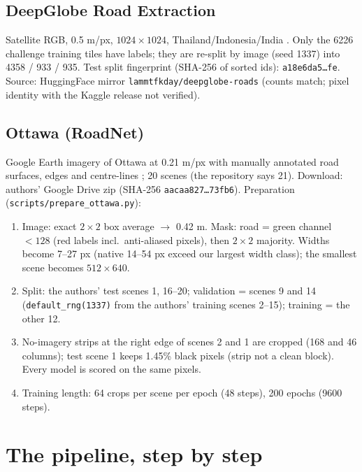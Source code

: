 \documentclass[11pt]{article}
\begin{document}
\subsection{DeepGlobe Road Extraction}
Satellite RGB, 0.5 m/px, $1024\times1024$, Thailand/Indonesia/India \cite{demir2018}. Only the 6226
challenge training tiles have labels; they are re-split by image (seed 1337) into 4358 / 933 / 935.
Test split fingerprint (SHA-256 of sorted ids): \texttt{a18e6da5\ldots fe}. Source: HuggingFace mirror
\texttt{lammtfkday/deepglobe-roads} (counts match; pixel identity with the Kaggle release not verified).

\subsection{Ottawa (RoadNet)}
Google Earth imagery of Ottawa at 0.21 m/px with manually annotated road surfaces, edges and
centre-lines \cite{liu2019roadnet}; 20 scenes (the repository says 21). Download: authors' Google Drive
zip (SHA-256 \texttt{aacaa827\ldots 73fb6}). Preparation (\texttt{scripts/prepare\_ottawa.py}):
\begin{enumerate}
  \item Image: exact $2\times2$ box average $\to$ 0.42 m. Mask: road = green channel $<128$ (red
        labels incl.\ anti-aliased pixels), then $2\times2$ majority. Widths become 7--27 px (native
        14--54 px exceed our largest width class); the smallest scene becomes $512\times640$.
  \item Split: the authors' test scenes 1, 16--20; validation = scenes 9 and 14
        (\texttt{default\_rng(1337)} from the authors' training scenes 2--15); training = the other 12.
  \item No-imagery strips at the right edge of scenes 2 and 1 are cropped (168 and 46 columns); test
        scene 1 keeps 1.45\% black pixels (strip not a clean block). Every model is scored on the same
        pixels.
  \item Training length: 64 crops per scene per epoch (48 steps), 200 epochs (9600 steps).
\end{enumerate}

\section{The pipeline, step by step}
\label{sec:pipeline}
\end{document}
